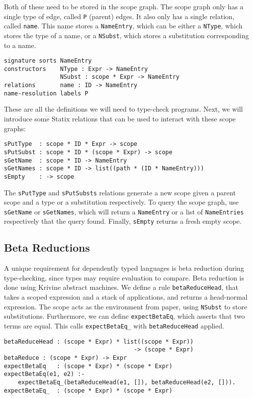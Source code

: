 \documentclass[a4paper,UKenglish,cleveref, autoref, thm-restate]{oasics-v2021}
\begin{document}
Both of these need to be stored in the scope graph. The scope graph only has a single type of edge, called \verb|P| (parent) edges. It also only has a single relation, called \verb|name|. This name stores a \verb|NameEntry|, which can be either a \verb|NType|, which stores the type of a name, or a \verb|NSubst|, which stores a substitution corresponding to a name. 

\begin{lstlisting}
signature sorts	NameEntry
constructors    NType : Expr -> NameEntry
                NSubst : scope * Expr -> NameEntry
relations       name : ID -> NameEntry
name-resolution	labels P
\end{lstlisting}

These are all the definitions we will need to type-check programs. Next, we will introduce some Statix relations that can be used to interact with these scope graphs:

\begin{lstlisting}
sPutType  : scope * ID * Expr -> scope
sPutSubst : scope * ID * (scope * Expr) -> scope
sGetName  : scope * ID -> NameEntry
sGetNames : scope * ID -> list((path * (ID * NameEntry)))
sEmpty    : -> scope
\end{lstlisting}

The \verb|sPutType| and \verb|sPutSubsts| relations generate a new scope given a parent scope and a type or a substitution respectively. To query the scope graph, use \verb|sGetName| or \verb|sGetNames|, which will return a \verb|NameEntry| or a list of \verb|NameEntries| respectively that the query found. Finally, \verb|sEmpty| returns a fresh empty scope.

\subsection{Beta Reductions}

A unique requirement for dependently typed languages is beta reduction during type-checking, since types may require evaluation to compare. Beta reduction is done using Krivine abstract machines\cite{krivine}. We define a rule \verb|betaReduceHead|, that takes a scoped expression and a stack of applications, and returns a head-normal expression. The scope acts as the environment from \cite{krivine} paper, using \verb|NSubst| to store substitutions. Furthermore, we can define \verb|expectBetaEq|, which asserts that two terms are equal. This calls \verb|expectBetaEq_| with \verb|betaReduceHead| applied.

\begin{lstlisting}
betaReduceHead : (scope * Expr) * list((scope * Expr))
                                     -> (scope * Expr)
betaReduce : (scope * Expr) -> Expr
expectBetaEq   : (scope * Expr) * (scope * Expr)
expectBetaEq(e1, e2) :- 
    expectBetaEq_(betaReduceHead(e1, []), betaReduceHead(e2, [])).
expectBetaEq_  : (scope * Expr) * (scope * Expr)
\end{lstlisting}	
\end{document}
